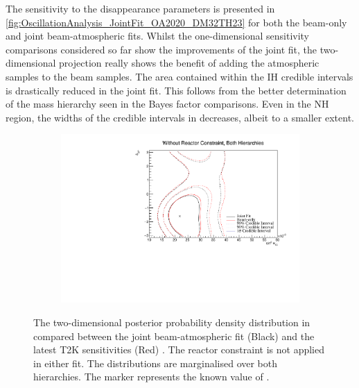 The sensitivity to the disappearance parameters  is presented in \autoref{fig:OscillationAnalysis_JointFit_OA2020_DM32TH23} for both the beam-only and joint beam-atmospheric fits. Whilst the one-dimensional sensitivity comparisons considered so far show the improvements of the joint fit, the two-dimensional projection really shows the benefit of adding the atmospheric samples to the beam samples. The area contained within the IH credible intervals is drastically reduced in the joint fit. This follows from the better determination of the mass hierarchy seen in the Bayes factor comparisons.
Even in the NH region, the widths of the credible intervals in  decreases, albeit to a smaller extent.

\begin{figure}[h]
  \begin{subfigure}[t]{0.98\textwidth}
    \includegraphics[width=\textwidth, trim={0mm 0mm 0mm 0mm}, clip,page=1]{Figures/OA/JointFit_OA2020_Comp/ContourComparison_2D_th13_dcp_BH_0_woRC_UnSmeared_CredibleInterval.pdf}
  \end{subfigure}
  \caption{The two-dimensional posterior probability density distribution in  compared between the joint beam-atmospheric fit (Black) and the latest T2K sensitivities (Red) \cite{Dunne2020-uf, t2k_tn_393}. The reactor constraint is not applied in either fit. The distributions are marginalised over both hierarchies. The marker represents the known value of .}
  \label{fig:OscillationAnalysis_JointFit_OA2020_DCPTH13}
\end{figure}

